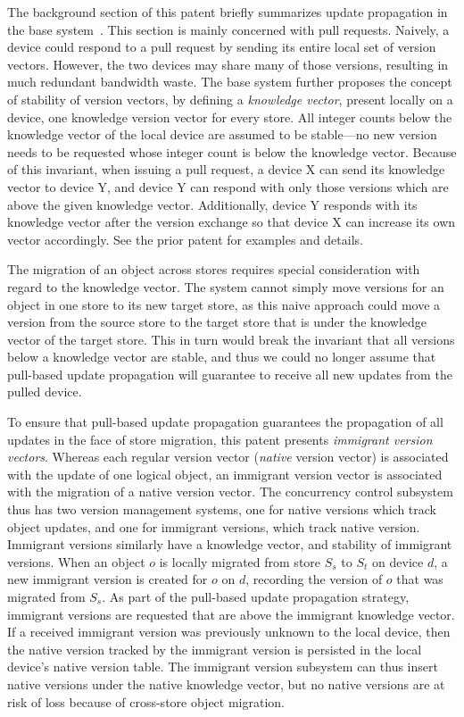 The background section of this patent briefly summarizes update propagation in
the base system~\cite{wang:patent2012}. This section is mainly concerned with
pull requests. Naively, a device could respond to a pull request by sending its
entire local set of version vectors. However, the two devices may share many of
those versions, resulting in much redundant bandwidth waste. The base system
further proposes the concept of stability of version vectors, by defining a {\em
knowledge vector}, present locally on a device, one knowledge version vector for
every store. All integer counts below the knowledge vector of the local device
are assumed to be stable---no new version needs to be requested whose integer
count is below the knowledge vector. Because of this invariant, when issuing a
pull request, a device X can send its knowledge vector to device Y, and device Y
can respond with only those versions which are above the given knowledge vector.
Additionally, device Y responds with its knowledge vector after the version
exchange so that device X can increase its own vector accordingly. See the prior
patent for examples and details.

The migration of an object across stores requires special consideration with
regard to the knowledge vector. The system cannot simply move versions for an
object in one store to its new target store, as this naive approach could move
a version from the source store to the target store that is under the knowledge
vector of the target store. This in turn would break the invariant that all
versions below a knowledge vector are stable, and thus we could no longer assume
that pull-based update propagation will guarantee to receive all new updates
from the pulled device.

To ensure that pull-based update propagation guarantees the propagation of all
updates in the face of store migration, this patent presents {\em immigrant
version vectors}. Whereas each regular version vector ({\em native} version
vector) is associated with the update of one logical object, an immigrant
version vector is associated with the migration of a native version vector.
The concurrency control subsystem thus has two version management systems, one
for native versions which track object updates, and one for immigrant versions,
which track native version. Immigrant versions similarly have a knowledge
vector, and stability of immigrant versions. When an object $o$ is locally
migrated from store $S_{s}$ to $S_t$ on device $d$, a new immigrant version is
created for $o$ on $d$, recording the version of $o$ that was migrated from
$S_s$. As part of the pull-based update propagation strategy, immigrant versions
are requested that are above the immigrant knowledge vector. If a received
immigrant version was previously unknown to the local device, then the native
version tracked by the immigrant version is persisted in the local device's native
version table. The immigrant version subsystem can thus insert native versions
under the native knowledge vector, but no native versions are at risk of loss
because of cross-store object migration.

